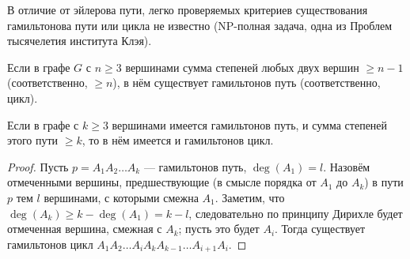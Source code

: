 \documentclass[12pt,a4paper]{article}
\begin{document}
    \begin{remark}
        В отличие от эйлерова пути, легко проверяемых критериев существования гамильтонова пути или цикла не известно (NP-полная задача, одна из Проблем тысячелетия института Клэя).
    \end{remark}

    \begin{theorem}[Дирака]\label{Dirac's-theorem}
        Если в графе $G$ с $n \geqslant 3$ вершинами сумма степеней любых двух вершин $\geqslant n-1$ (соответственно, $\geqslant n$), в нём существует гамильтонов путь (соответственно, цикл).
    \end{theorem}

    \begin{lemma}
        Если в графе с $k \geqslant 3$ вершинами имеется гамильтонов путь, и сумма степеней этого пути $\geqslant k$, то в нём имеется и гамильтонов цикл.
    \end{lemma}

    \begin{proof}
        Пусть $p = A_1A_2\dots A_k$ --- гамильтонов путь, $\deg(A_1) = l$. Назовём отмеченными вершины, предшествующие (в смысле порядка от $A_1$ до $A_k$) в пути $p$ тем $l$ вершинами, с которыми смежна $A_1$. Заметим, что $\deg(A_k) \geqslant k - \deg(A_1) = k - l$, следовательно по принципу Дирихле будет отмеченная вершина, смежная с $A_k$; пусть это будет $A_i$. Тогда существует гамильтонов цикл $A_1 A_2\dots A_i A_k A_{k-1} \dots A_{i+1} A_i$.
    \end{proof}
\end{document}
